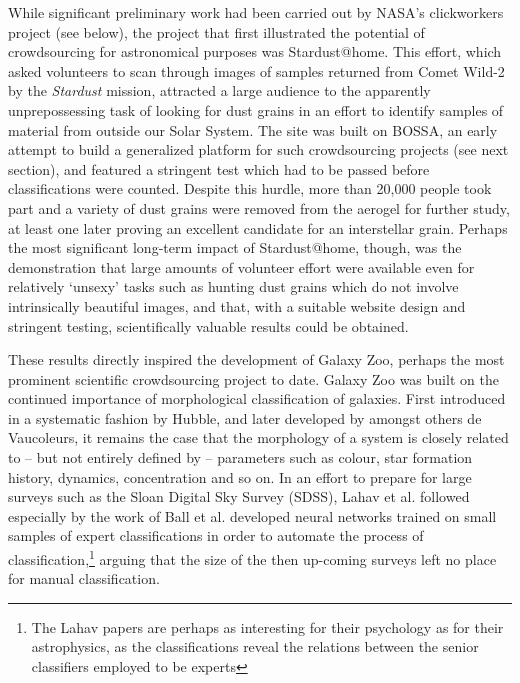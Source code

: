 \documentclass{ar2e}
\begin{document}
While significant preliminary work had been carried out by NASA's clickworkers
project (see below), the project that first illustrated the potential of
crowdsourcing for astronomical purposes was Stardust@home. This effort, which
asked volunteers to scan through images of samples returned from Comet Wild-2
by the \emph{Stardust} mission, attracted a large audience to the apparently
unprepossessing task of looking for dust grains in an effort to identify
samples of material from outside our Solar System. The site was built on
BOSSA, an early attempt to build a generalized platform for such crowdsourcing
projects (see next section), and featured a stringent test which had to be
passed before classifications were counted. Despite this hurdle, more than
20,000 people took part and a variety of dust grains were removed from the
aerogel for further study, at least one later proving an excellent candidate
for an interstellar grain. Perhaps the most significant long-term impact of
Stardust@home, though, was the demonstration that large amounts of volunteer
effort were available even for relatively `unsexy' tasks such as hunting dust
grains which do not involve intrinsically beautiful images, and that, with a
suitable website design and stringent testing, scientifically valuable results
could be obtained. 



These results directly inspired the development of Galaxy Zoo, perhaps the most
prominent scientific crowdsourcing project to date. Galaxy Zoo was built on the
continued importance of morphological classification of galaxies. First
introduced in a systematic fashion by Hubble, and later developed by amongst
others de Vaucoleurs, it remains the case that the morphology of a system is
closely related to -- but not entirely defined by -- parameters such as colour,
star formation history, dynamics, concentration and so on.  In an effort to
prepare for large surveys such as the Sloan Digital Sky Survey (SDSS), Lahav et
al. followed especially by the work of Ball et al. developed neural networks
trained on small samples of expert classifications in order to automate the
process of classification,\footnote{The Lahav papers are perhaps as interesting
for their psychology as for their astrophysics, as the classifications reveal
the relations between the senior classifiers employed to be experts} arguing
that the size of the then up-coming surveys left no place for manual
classification.
\end{document}
